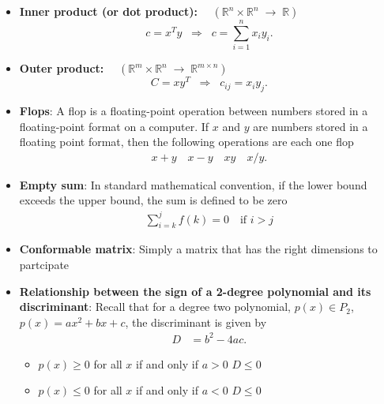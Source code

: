 \documentclass{report}
\begin{document}
\begin{itemize}
        \item \textbf{Inner product (or dot product): } $\quad (\mathbb{R}^n \times \mathbb{R}^n \;\to\; \mathbb{R})$
            \[
                c = x^T y 
                \;\;\Longrightarrow\;\; 
                c = \sum_{i=1}^{n} x_i y_i.
            \]

            \item \textbf{Outer product: } $\quad (\mathbb{R}^m \times \mathbb{R}^n \;\to\; \mathbb{R}^{m \times n})$
            \[
                C = x y^T 
                \;\;\Longrightarrow\;\; 
                c_{ij} = x_i y_j.
            \]
        \item \textbf{Flops}: A flop is a floating-point operation between numbers stored in a floating-point format on a computer.
            \bigbreak \noindent 
            If $x$ and $y$ are numbers stored in a floating point format, then the following operations are each one flop
            \begin{align*}
                x + y \quad x - y \quad xy \quad x / y
            .\end{align*}

        \item \textbf{Empty sum}: In standard mathematical convention, if the lower bound exceeds the upper bound, the sum is defined to be zero
            \begin{align*}
                \sum_{i=k}^{j} f(k) = 0 \quad \text{if } i > j
            \end{align*}

        \item \textbf{Conformable matrix}: Simply a matrix that has the right dimensions to partcipate
        \item \textbf{Relationship between the sign of a 2-degree polynomial and its discriminant}: Recall that for a degree two polynomial, $p(x) \in P_{2}$, $p(x) = ax^{2} + bx +c$, the discriminant is given by
            \begin{align*}
                D &= b^{2} - 4ac
            .\end{align*}
            \begin{itemize}
                \item $p(x) \geq 0$ for all $x$ if and only if $a > 0 $ $D \leq 0$
                \item $p(x) \leq 0$ for all $x$ if and only if $a < 0 $ $D \leq 0$
            \end{itemize}





    \end{itemize}
\end{document}

